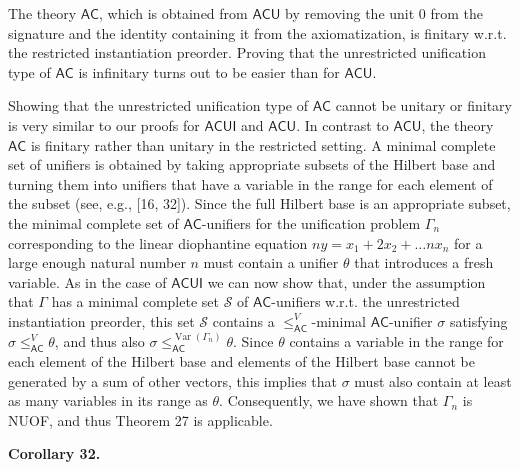 \documentclass[10pt,a4paper]{amsart}
\begin{document}

 
The theory $\mathsf{AC}$, which is obtained from $\mathsf{ACU}$ by removing the unit $0$ from the signature and the identity containing it from the axiomatization, is finitary w.r.t. the restricted instantiation preorder. Proving that the unrestricted unification type of $\mathsf{AC}$ is infinitary turns out to be easier than for $\mathsf{ACU}$.\par
 
 
 
Showing that the unrestricted unification type of $\mathsf{AC}$ cannot be unitary or finitary is very similar to our proofs for $\mathsf{ACUI}$ and $\mathsf{ACU}$. In contrast to $\mathsf{ACU}$, the theory $\mathsf{AC}$ is finitary rather than unitary in the restricted setting. A minimal complete set of unifiers is obtained by taking appropriate subsets of the Hilbert base and turning them into unifiers that have a variable in the range for each element of the subset (see, e.g., [16, 32]). Since the full Hilbert base is an appropriate subset, the minimal complete set of $\mathsf{AC}$-unifiers for the unification problem $\Gamma_{n}$ corresponding to the linear diophantine equation $ny=x_{1}+2x_{2}+\ldots nx_{n}$ for a large enough natural number $n$ must contain a unifier $\theta$ that introduces a fresh variable. As in the case of $\mathsf{ACUI}$ we can now show that, under the assumption that $\Gamma$ has a minimal complete set $\mathcal{S}$ of $\mathsf{AC}$-unifiers w.r.t. the unrestricted instantiation preorder, this set $\mathcal{S}$ contains a $\leq_{\mathsf{AC}}^{V}$-minimal $\mathsf{AC}$-unifier $\sigma$ satisfying $\sigma\leq_{\mathsf{AC}}^{V}\theta$, and thus also $\sigma\leq_{\mathsf{AC}}^{\operatorname{Var}(\Gamma_{n})}\theta$. Since $\theta$ contains a variable in the range for each element of the Hilbert base and elements of the Hilbert base cannot be generated by a sum of other vectors, this implies that $\sigma$ must also contain at least as many variables in its range as $\theta$. Consequently, we have shown that $\Gamma_{n}$ is NUOF, and thus Theorem 27 is applicable.\par
 
 
 
\par\medskip\noindent\textbf{Corollary 32.}\par
 
\end{document}
